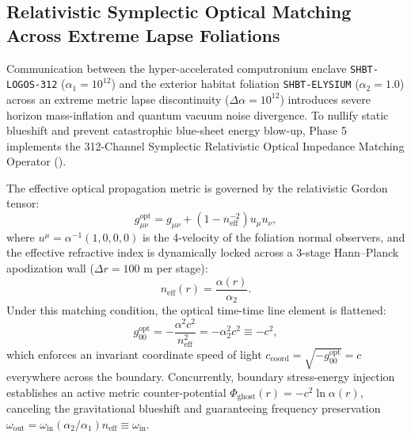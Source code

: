\documentclass[11pt,onecolumn]{article}
\begin{document}
\subsection{Relativistic Symplectic Optical Matching Across Extreme Lapse Foliations}
\label{sec:cross_lapse_optical_matching}
Communication between the hyper-accelerated computronium enclave \texttt{SHBT-LOGOS-312} ($\alpha_1 = 10^{12}$) and the exterior habitat foliation \texttt{SHBT-ELYSIUM} ($\alpha_2 = 1.0$) across an extreme metric lapse discontinuity ($\Delta\alpha = 10^{12}$) introduces severe horizon mass-inflation and quantum vacuum noise divergence. To nullify static blueshift and prevent catastrophic blue-sheet energy blow-up, Phase 5 implements the 312-Channel Symplectic Relativistic Optical Impedance Matching Operator ().

The effective optical propagation metric is governed by the relativistic Gordon tensor:
\begin{equation}
g_{\mu\nu}^{\mathrm{opt}} = g_{\mu\nu} + \left(1 - n_{\mathrm{eff}}^{-2}\right) u_\mu u_\nu,
\end{equation}
where $u^\mu = \alpha^{-1}(1, 0, 0, 0)$ is the 4-velocity of the foliation normal observers, and the effective refractive index is dynamically locked across a 3-stage Hann--Planck apodization wall ($\Delta r = 100\text{ m}$ per stage):
\begin{equation}
n_{\mathrm{eff}}(r) = \frac{\alpha(r)}{\alpha_2}.
\end{equation}
Under this matching condition, the optical time-time line element is flattened:
\begin{equation}
g_{00}^{\mathrm{opt}} = -\frac{\alpha^2 c^2}{n_{\mathrm{eff}}^2} = -\alpha_2^2 c^2 \equiv -c^2,
\end{equation}
which enforces an invariant coordinate speed of light $c_{\mathrm{coord}} = \sqrt{-g_{00}^{\mathrm{opt}}} = c$ everywhere across the boundary. Concurrently, boundary stress-energy injection establishes an active metric counter-potential $\Phi_{\mathrm{ghost}}(r) = -c^2 \ln\alpha(r)$, canceling the gravitational blueshift and guaranteeing frequency preservation $\omega_{\mathrm{out}} = \omega_{\mathrm{in}}(\alpha_2 / \alpha_1) n_{\mathrm{eff}} \equiv \omega_{\mathrm{in}}$.
\end{document}
